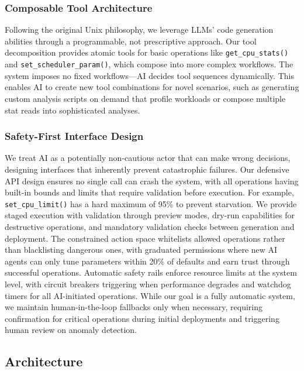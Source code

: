 \subsubsection{Composable Tool Architecture}

Following the original Unix philosophy, we leverage LLMs' code generation abilities through a programmable, not prescriptive approach. Our tool decomposition provides atomic tools for basic operations like \texttt{get\_cpu\_stats()} and \texttt{set\_scheduler\_param()}, which compose into more complex workflows. The system imposes no fixed workflows—AI decides tool sequences dynamically. This enables AI to create new tool combinations for novel scenarios, such as generating custom analysis scripts on demand that profile workloads or compose multiple stat reads into sophisticated analyses.

\subsubsection{Safety-First Interface Design}

We treat AI as a potentially non-cautious actor that can make wrong decisions, designing interfaces that inherently prevent catastrophic failures. Our defensive API design ensures no single call can crash the system, with all operations having built-in bounds and limits that require validation before execution. For example, \texttt{set\_cpu\_limit()} has a hard maximum of 95\% to prevent starvation. We provide staged execution with validation through preview modes, dry-run capabilities for destructive operations, and mandatory validation checks between generation and deployment. The constrained action space whitelists allowed operations rather than blacklisting dangerous ones, with graduated permissions where new AI agents can only tune parameters within 20\% of defaults and earn trust through successful operations. Automatic safety rails enforce resource limits at the system level, with circuit breakers triggering when performance degrades and watchdog timers for all AI-initiated operations. While our goal is a fully automatic system, we maintain human-in-the-loop fallbacks only when necessary, requiring confirmation for critical operations during initial deployments and triggering human review on anomaly detection.

\subsection{\sys Architecture}

